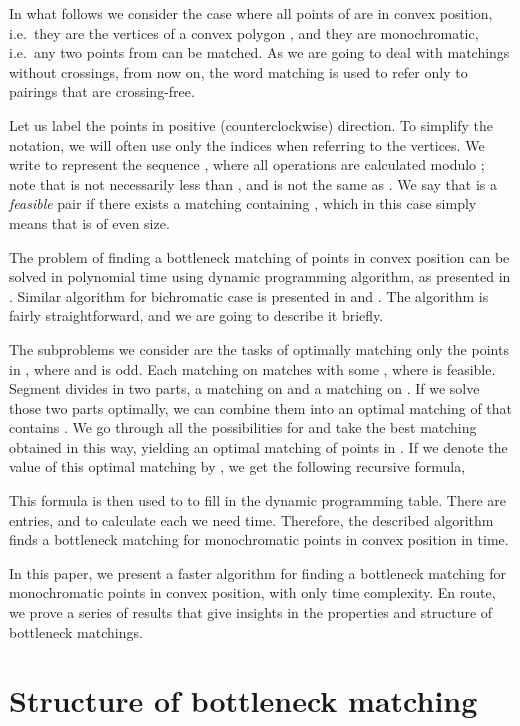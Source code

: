 \documentclass[a4paper, 11pt]{article}
\begin{document}
In what follows we consider the case where all points of  are in convex position, i.e.\ they are the vertices of a convex polygon , and they are monochromatic, i.e.\ any two points from  can be matched.
As we are going to deal with matchings without crossings, from now on, the word matching is used to refer only to pairings that are crossing-free.

Let us label the points  in positive (counterclockwise) direction. To simplify the notation, we will often use only the indices when referring to the vertices. We write  to represent the sequence , where all operations are calculated modulo ; note that  is not necessarily less than , and  is not the same as . We say that  is a \emph{feasible} pair if there exists a matching containing , which in this case simply means that  is of even size.

The problem of finding a bottleneck matching of points in convex position can be solved in polynomial time using dynamic programming algorithm, as presented in \cite{abu2014bottleneck}. Similar algorithm for bichromatic case is presented in \cite{biniaz2014bottleneck} and \cite{carlsson2015bottleneck}. The algorithm is fairly straightforward, and we are going to describe it briefly.

The subproblems we consider are the tasks of optimally matching only the points in , where  and  is odd. Each matching  on  matches  with some , where  is feasible. Segment  divides  in two parts, a matching on  and a matching on . If we solve those two parts optimally, we can combine them into an optimal matching of  that contains . We go through all the possibilities for  and take the best matching obtained in this way, yielding an optimal matching of points in . If we denote the value of this optimal matching by , we get the following recursive formula,



This formula is then used to to fill in the dynamic programming table. There are  entries, and to calculate each we need  time. Therefore, the described algorithm finds a bottleneck matching for monochromatic points in convex position in  time.

In this paper, we present a faster algorithm for finding a bottleneck matching for monochromatic points in convex position, with only  time complexity. En route, we prove a series of results that give insights in the properties and structure of bottleneck matchings.


\section{Structure of bottleneck matching}
\end{document}
